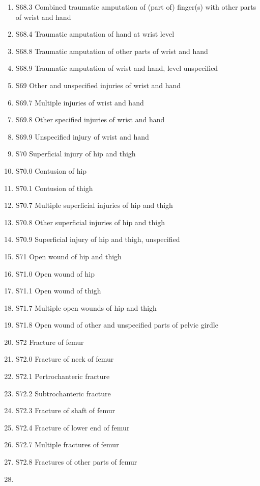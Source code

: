 \documentclass[
]{scrartcl}
\begin{document}
\begin{itemize}
\begin{enumerate}
  \item
    S68.3 Combined traumatic amputation of (part of) finger(s) with
    other parts of wrist and hand
  \item
    S68.4 Traumatic amputation of hand at wrist level
  \item
    S68.8 Traumatic amputation of other parts of wrist and hand
  \item
    S68.9 Traumatic amputation of wrist and hand, level unspecified
  \item
    S69 Other and unspecified injuries of wrist and hand
  \item
    S69.7 Multiple injuries of wrist and hand
  \item
    S69.8 Other specified injuries of wrist and hand
  \item
    S69.9 Unspecified injury of wrist and hand
  \item
    S70 Superficial injury of hip and thigh
  \item
    S70.0 Contusion of hip
  \item
    S70.1 Contusion of thigh
  \item
    S70.7 Multiple superficial injuries of hip and thigh
  \item
    S70.8 Other superficial injuries of hip and thigh
  \item
    S70.9 Superficial injury of hip and thigh, unspecified
  \item
    S71 Open wound of hip and thigh
  \item
    S71.0 Open wound of hip
  \item
    S71.1 Open wound of thigh
  \item
    S71.7 Multiple open wounds of hip and thigh
  \item
    S71.8 Open wound of other and unspecified parts of pelvic girdle
  \item
    S72 Fracture of femur
  \item
    S72.0 Fracture of neck of femur
  \item
    S72.1 Pertrochanteric fracture
  \item
    S72.2 Subtrochanteric fracture
  \item
    S72.3 Fracture of shaft of femur
  \item
    S72.4 Fracture of lower end of femur
  \item
    S72.7 Multiple fractures of femur
  \item
    S72.8 Fractures of other parts of femur
  \item

\end{enumerate}
\end{itemize}
\end{document}
